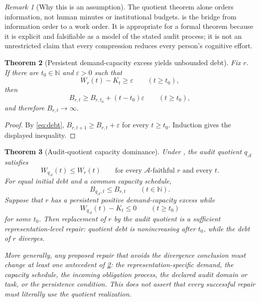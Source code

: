 \documentclass[11pt]{article}
\newcommand{\N}{\mathbb N}
\newcommand{\qA}{q_{\mathcal A}}
\newcommand{\mcA}{\mathcal A}
\newcommand{\Debt}{\ensuremath{B}}
\newcommand{\Demand}{\ensuremath{W}}
\newcommand{\AuditCap}{\ensuremath{K}}
\theoremstyle{plain}
\newtheorem{theorem}{Theorem}[section]
\theoremstyle{definition}
\theoremstyle{remark}
\newtheorem{remark}[theorem]{Remark}
\begin{document}
\begin{remark}[Why this is an assumption]
\label{rem:cost-assumption}
The quotient theorem alone orders information, not human minutes or institutional
budgets.   is the bridge from information order to a work order.
It is appropriate for a formal theorem because it is explicit and falsifiable as
a model of the stated audit process; it is not an unrestricted claim that every
compression reduces every person's cognitive effort.
\end{remark}

\begin{theorem}[Persistent demand-capacity excess yields unbounded debt]
\label{thm:debt}
Fix $r$.  If there are $t_0\in\N$ and $\varepsilon>0$ such that
\[
  \Demand_r(t)-\AuditCap_t\geq\varepsilon
  \qquad(t\geq t_0),
\]
then
\[
  \Debt_{r,t}\geq\Debt_{r,t_0}+(t-t_0)\varepsilon
  \qquad(t\geq t_0),
\]
and therefore $\Debt_{r,t}\to\infty$.
\end{theorem}

\begin{proof}
By \eqref{eq:debt},
$\Debt_{r,t+1}\geq\Debt_{r,t}+\varepsilon$ for every $t\geq t_0$.
Induction gives the displayed inequality.
\end{proof}

\begin{theorem}[Audit-quotient capacity dominance]
\label{thm:capacity}
Under , the audit quotient $\qA$ satisfies
\[
  \Demand_{\qA}(t)\leq\Demand_r(t)
  \qquad\text{for every $\mcA$-faithful $r$ and every $t$.}
  \tag{C2}\label{eq:dominance}
\]
For equal initial debt and a common capacity schedule,
\[
  \Debt_{\qA,t}\leq\Debt_{r,t}
  \qquad(t\in\N).
  \tag{C3}\label{eq:debt-dominance}
\]
Suppose that $r$ has a persistent positive demand-capacity excess while
\[
  \Demand_{\qA}(t)-\AuditCap_t\leq0
  \qquad(t\geq t_0)
  \tag{C4}\label{eq:quotient-within-capacity}
\]
for some $t_0$.  Then replacement of $r$ by the audit quotient is a sufficient
representation-level repair: quotient debt is nonincreasing after $t_0$, while
the debt of $r$ diverges.

More generally, any proposed repair that avoids the divergence conclusion must
change at least one antecedent of \cref{thm:debt}: the
representation-specific demand, the capacity schedule, the incoming obligation
process, the declared audit domain or task, or the persistence condition.  This
does not assert that every successful repair must literally use the quotient
realization.
\end{theorem}
\end{document}
